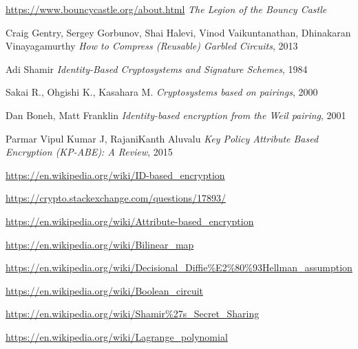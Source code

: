 \documentclass[12pt]{article}
\begin{document}
\begin{thebibliography}{9}
\href{https://www.bouncycastle.org/about.html}{https://www.bouncycastle.org/about.html}
\textit{The Legion of the Bouncy Castle}

Craig Gentry, Sergey Gorbunov, Shai Halevi, Vinod Vaikuntanathan, Dhinakaran Vinayagamurthy
\textit{How to Compress (Reusable) Garbled Circuits}, 2013

Adi Shamir
\textit{Identity-Based Cryptosystems and Signature Schemes}, 1984 

Sakai R., Ohgishi K., Kasahara M.
\textit{Cryptosystems based on pairings}, 2000 

Dan Boneh, Matt Franklin
\textit{Identity-based encryption from the Weil pairing}, 2001

Parmar Vipul Kumar J, RajaniKanth Aluvalu
\textit{Key Policy Attribute Based Encryption (KP-ABE): A Review}, 2015

\href{https://en.wikipedia.org/wiki/ID-based_encryption}{https://en.wikipedia.org/wiki/ID-based\_encryption}

\href{https://crypto.stackexchange.com/questions/17893/what-is-attribute-based-encryption?utm_medium=organic&utm_source=google_rich_qa&utm_campaign=google_rich_qa}{https://crypto.stackexchange.com/questions/17893/}

\href{https://en.wikipedia.org/wiki/Attribute-based_encryption}{https://en.wikipedia.org/wiki/Attribute-based\_encryption}

\href{https://en.wikipedia.org/wiki/Bilinear_map}{https://en.wikipedia.org/wiki/Bilinear\_map}

\href{https://en.wikipedia.org/wiki/Decisional_Diffie\%E2\%80\%93Hellman_assumption}{https://en.wikipedia.org/wiki/Decisional\_Diffie\%E2\%80\%93Hellman\_assumption}

\href{https://en.wikipedia.org/wiki/Boolean_circuit}{https://en.wikipedia.org/wiki/Boolean\_circuit}

\href{https://en.wikipedia.org/wiki/Shamir\%27s_Secret_Sharing}{https://en.wikipedia.org/wiki/Shamir\%27s\_Secret\_Sharing}

\href{https://en.wikipedia.org/wiki/Lagrange_polynomial}{https://en.wikipedia.org/wiki/Lagrange\_polynomial}

\end{thebibliography}

\vspace{\baselineskip}
\end{document}
